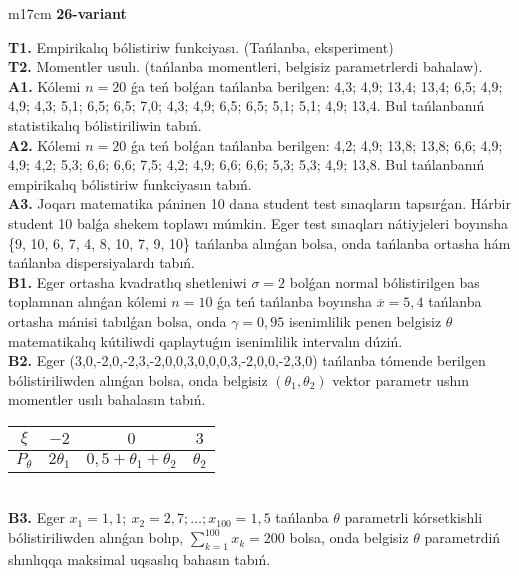 \documentclass{article}
\begin{document}
\vspace{1cm}


\begin{tabular}{m{17cm}}
\textbf{26-variant}
\newline

\textbf{T1.} 
Empirikalıq bólistiriw funkciyası. (Tańlanba, eksperiment)
 \\
\textbf{T2.} 
Momentler usulı. (tańlanba momentleri, belgisiz parametrlerdi bahalaw).
 \\
\textbf{A1.} 
Kólemi \(n = 20\) ǵa teń bolǵan tańlanba berilgen: 4,3; 4,9; 13,4; 13,4; 6,5; 4,9; 4,9; 4,3; 5,1; 6,5; 6,5; 7,0; 4,3; 4,9; 6,5; 6,5; 5,1; 5,1; 4,9; 13,4. Bul tańlanbanıń statistikalıq bólistiriliwin tabıń.
 \\
\textbf{A2.} 
Kólemi \(n = 20\) ǵa teń bolǵan tańlanba berilgen: 4,2; 4,9; 13,8; 13,8; 6,6; 4,9; 4,9; 4,2; 5,3; 6,6; 6,6; 7,5; 4,2; 4,9; 6,6; 6,6; 5,3; 5,3; 4,9; 13,8. Bul tańlanbanıń empirikalıq bólistiriw funkciyasın tabıń.
 \\
\textbf{A3.} 
Joqarı matematika páninen 10 dana student test sınaqların tapsırǵan. Hárbir student 10 balǵa shekem toplawı múmkin. Eger test sınaqları nátiyjeleri boyınsha \{9, 10, 6, 7, 4, 8, 10, 7, 9, 10\} tańlanba alınǵan bolsa, onda tańlanba ortasha hám tańlanba dispersiyalardı tabıń.
 \\
\textbf{B1.} 
Eger ortasha kvadratlıq shetleniwi \(\sigma = 2\) bolǵan normal bólistirilgen bas toplamnan alınǵan kólemi \(n = 10\) ǵa teń tańlanba boyınsha \(\overline{x} = 5,4\) tańlanba ortasha mánisi tabılǵan bolsa, onda \(\gamma = 0,95\) isenimlilik penen belgisiz \(\theta\) matematikalıq kútiliwdi qaplaytuǵın isenimlilik intervalın dúziń.
 \\
\textbf{B2.} 
Eger (3,0,-2,0,-2,3,-2,0,0,3,0,0,0,3,-2,0,0,-2,3,0) tańlanba tómende berilgen bólistiriliwden alınǵan bolsa, onda belgisiz \(\left( \theta_{1},\theta_{2} \right)\) vektor parametr ushın momentler usılı bahalasın tabıń.
\begin{tabular}{|c|c|c|c|}
  \hline
$\xi$ &
$- 2$ &
$0$ &
$3$\\
\hline
\(P_{\theta}\) & \({2\theta}_{1}\) & \(0,5 + \theta_{1} + \theta_{2}\) & \(\theta_{2}\) \\
\hline
\end{tabular}
 \\
\textbf{B3.} 
Eger \(x_{1} = 1,1;\ x_{2} = 2,7;\ldots;x_{100} = 1,5\) tańlanba \(\theta\) parametrli kórsetkishli bólistiriliwden alınǵan bolıp, \(\sum_{k = 1}^{100}x_{k} = 200\) bolsa, onda belgisiz \(\theta\) parametrdiń shınlıqqa maksimal uqsaslıq bahasın tabıń.

\end{tabular}
\end{document}

